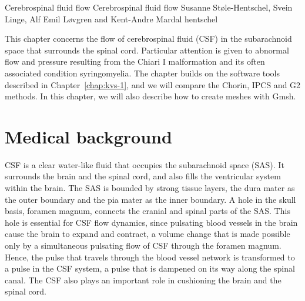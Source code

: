               {Cerebrospinal fluid flow}
              {Cerebrospinal fluid flow}
              {Susanne St\o le-Hentschel, Svein Linge, Alf Emil L{\o}vgren and Kent-Andre Mardal}
              {hentschel}

This chapter concerns the flow of cerebrospinal fluid (CSF) in the
subarachnoid space that surrounds the spinal cord. Particular
attention is given to abnormal flow and pressure resulting from the
Chiari I malformation and its often associated condition
syringomyelia. The chapter builds on the software tools described in
Chapter~\ref{chap:kvs-1}, and we will compare the Chorin, IPCS and G2
methods. In this chapter, we will also describe how to create meshes
with Gmsh.

\section{Medical background}

CSF is a clear water-like fluid that occupies the subarachnoid
space (SAS).  It surrounds the brain and the spinal cord, and also
fills the ventricular system within the brain. The SAS is bounded by
strong tissue layers, the dura mater as the outer boundary and the pia
mater as the inner boundary. A hole in the skull basis, foramen
magnum, connects the cranial and spinal parts of
the SAS. This hole is essential for CSF flow dynamics, since pulsating
blood vessels in the brain cause the brain to expand and contract, a
volume change that is made possible only by a simultaneous pulsating
flow of CSF through the foramen magnum. Hence, the pulse that travels
through the blood vessel network is transformed to a pulse in the CSF
system, a pulse that is dampened on its way along the spinal
canal. The CSF also plays an important role in cushioning the brain
and the spinal cord.

